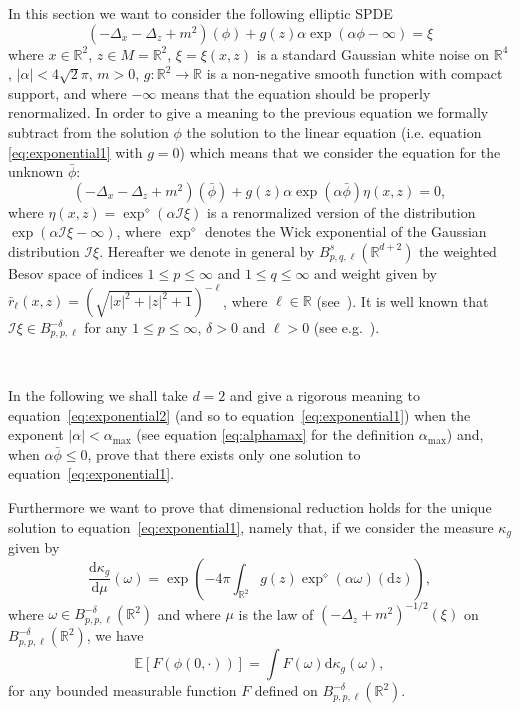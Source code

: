 \documentclass[a4paper,10pt]{article}
\newcommand{\mathd}{\mathrm{d}}
\begin{document}
In this section we want to consider the following elliptic SPDE
\begin{equation}
  (- \Delta_x - \Delta_z + m^2) (\phi) + g (z) \alpha \exp (\alpha \phi -
  \infty) = \xi \label{eq:exponential1}
\end{equation}
where $x \in \mathbb{R}^2$, $z \in M =\mathbb{R}^2$, $\xi = \xi (x, z)$ is a
standard Gaussian white noise on $\mathbb{R}^4$, $| \alpha | < 4 \sqrt{2}
\pi$, $m > 0$, $g : \mathbb{R}^2 \rightarrow \mathbb{R}$ is a non-negative
smooth function with compact support, and where $- \infty$ means that the
equation should be properly renormalized. In order to give a meaning to the
previous equation we formally subtract from the solution $\phi$ the solution
to the linear equation (i.e. equation {\eqref{eq:exponential1}} with $g = 0$)
which means that we consider the equation for the unknown $\bar{\phi}$:
\begin{equation}
  (- \Delta_x - \Delta_z + m^2) (\bar{\phi}) + g (z) \alpha \exp (\alpha
  \bar{\phi}) \eta (x, z) = 0 \label{eq:exponential2},
\end{equation}
where $\eta (x, z) = \exp^{\diamond} (\alpha \mathcal{I} \xi)$ is a
renormalized version of the distribution $\exp (\alpha \mathcal{I} \xi -
\infty)$, where $\exp^{\diamond}$ denotes the Wick exponential of the Gaussian
distribution $\mathcal{I} \xi$. Hereafter we denote in general by $B^s_{p, q,
\ell} (\mathbb{R}^{d + 2})$ the weighted Besov space of indices $1 \leqslant p
\leqslant \infty$ and $1 \leqslant q \leqslant \infty$ and weight given by
$\bar{r}_{\ell} (x, z) = \left( \sqrt{| x |^2 + | z |^2 + 1} \right)^{-
\ell}$, where $\ell \in \mathbb{R}$ (see~{\cite{Triebel2006}}). It is well
known that $\mathcal{I} \xi \in B^{- \delta}_{p, p, \ell}$ for any $1
\leqslant p \leqslant \infty$, $\delta > 0$ and $\ell > 0$ (see
e.g.~{\cite{GH18}}).

\

In the following we shall take $d = 2$ and give a rigorous meaning to
equation~{\eqref{eq:exponential2}} (and so to
equation~{\eqref{eq:exponential1}}) when the exponent $| \alpha | < \alpha_{\text{max}}$ (see equation \eqref{eq:alphamax} for the definition $\alpha_{\text{max}}$) and, when $\alpha \bar{\phi} \leqslant 0$, prove that there exists only
one solution to equation~{\eqref{eq:exponential1}}.

Furthermore we want to prove that dimensional reduction holds for the unique
solution to equation~{\eqref{eq:exponential1}}, namely that, if we consider
the measure $\kappa_g$ given by
\begin{equation}
  \frac{\mathd \kappa_g}{\mathd \mu} (\omega) = \exp \left( - 4 \pi
  \int_{\mathbb{R}^2} g (z) \exp^{\diamond} (\alpha \omega) (\mathd z)
  \right), \label{eq:exponentiallaw1}
\end{equation}
where $\omega \in B^{- \delta}_{p, p, \ell} (\mathbb{R}^2)$ and where $\mu$ is
the law of $(- \Delta_z + m^2)^{- 1 / 2} (\xi)$ on $B^{- \delta}_{p, p, \ell}
(\mathbb{R}^2)$, we have
\[ \mathbb{E} [F (\phi (0, \cdot))] = \int F (\omega) \mathd \kappa_g (\omega)
   \label{eq:exponentialreduction1}, \]
for any bounded measurable function $F$ defined on $B^{- \delta}_{p, p, \ell}
(\mathbb{R}^2)$.
\end{document}
